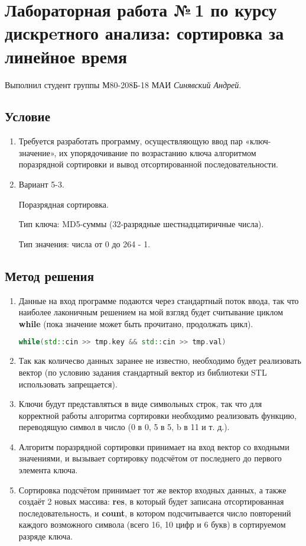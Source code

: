\documentclass[12pt]{article}
\begin{document}
\section*{Лабораторная работа №\,1 по курсу дискрeтного анализа: сортировка за линейное время}

Выполнил студент группы М80-208Б-18 МАИ \textit{Синявский Андрей}.

\subsection*{Условие}
\begin{enumerate}
\item Требуется разработать программу, осуществляющую ввод пар «ключ-значение», их упорядочивание по возрастанию ключа алгоритмом поразрядной сортировки и вывод отсортированной последовательности. 
\item Вариант 5-3.

Поразрядная сортировка.

Тип ключа: MD5-суммы (32-разрядные шестнадцатиричные числа).

Тип значения: числа от 0 до 264 - 1.
\end{enumerate}

\subsection*{Метод решения}

\begin{enumerate}
    \item Данные на вход программе подаются через стандартный поток ввода, так что наиболее лаконичным решением на мой взгляд будет считывание циклом \textbf{while} (пока значение может быть прочитано, продолжать цикл). 
    \begin{lstlisting}[language=C++]
    while(std::cin >> tmp.key && std::cin >> tmp.val)
    \end{lstlisting}
    \item Так как количесво данных заранее не известно, необходимо будет реализовать вектор (по условию задания стандартный вектор из библиотеки STL использовать запрещается).
    \item Ключи будут представляться в виде символьных строк, так что для корректной работы алгоритма сортировки необходимо реализовать функцию, переводящую символ в число (0 в 0, 5 в 5, b в 11 и т. д.).
    \item Алгоритм поразрядной сортировки принимает на вход вектор со входными значениями, и вызывает сортировку подсчётом от последнего до первого элемента ключа.
    \item Сортировка подсчётом принимает тот же вектор входных данных, а также создаёт 2 новых массива: \textbf{res}, в который будет записана отсортированная последовательность, и \textbf{count}, в котором подсчитывается число повторений каждого возможного символа (всего 16, 10 цифр и 6 букв) в сортируемом разряде ключа.
\end{enumerate}
\end{document}
